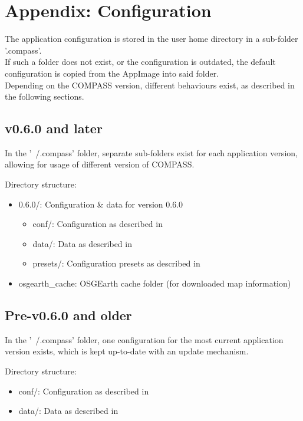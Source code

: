 \section{Appendix: Configuration}
\label{sec:appendix_configuration}

The application configuration is stored in the user home directory in a sub-folder '.compass'. \\

If such a folder does not exist, or the configuration is outdated, the default configuration is copied from the AppImage into said folder. \\

Depending on the COMPASS version, different behaviours exist, as described in the following sections.

\subsection{v0.6.0 and later}

In the '~/.compass' folder, separate sub-folders exist for each application version, allowing for usage of different version of COMPASS.

Directory structure:
\begin{itemize}
\item 0.6.0/: Configuration \& data for version 0.6.0
\begin{itemize}
\item conf/: Configuration as described in 
\item data/: Data as described in 
\item presets/: Configuration presets as described in 
\end{itemize}
\item osgearth\_cache: OSGEarth cache folder (for downloaded map information)
\end{itemize}

\subsection{Pre-v0.6.0 and older}

In the '~/.compass' folder, one configuration for the most current application version exists, which is kept up-to-date with an update mechanism.

Directory structure:
\begin{itemize}
\item conf/: Configuration as described in 
\item data/: Data as described in 
\end{itemize}

